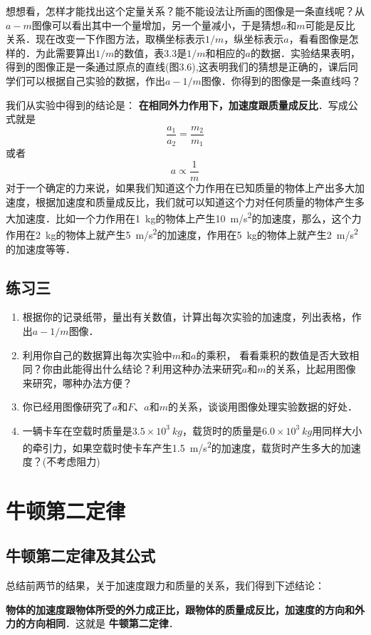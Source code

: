 想想看，怎样才能找出这个定量关系？能不能设法让所画的图像是一条直线呢？从$a-m$图像可以看出其中一个量增加，另一个量减小，于是猜想$a$和$m$可能是反比关系．现在改变一下作图方法，取横坐标表示$1/m$，纵坐标表示$a$，看看图像是怎样的．为此需要算出$1/m$的数值，表3.3是$1/m$和相应的$a$的数据．实验结果表明，得到的图像正是一条通过原点的直线(图3.6),这表明我们的猜想是正确的，课后同学们可以根据自己实验的数据，作出$a-1/m$图像．你得到的图像是一条直线吗？


我们从实验中得到的结论是：\textbf{ 在相同外力作用下，加速度跟质量成反比}．写成公式就是
\[\frac{a_1}{a_2}=\frac{m_2}{m_1} \]
或者
\[a\propto \frac{1}{m} \]
对于一个确定的力来说，如果我们知道这个力作用在已知质量的物体上产出多大加速度，根据加速度和质量成反比，我们就可以知道这个力对任何质量的物体产生多大加速度．比如一个力作用在\SI{1}{kg}的物体上产生\SI{10}{m/s^2}的加速度，那么，这个力作用在\SI{2}{kg}的物体上就产生\SI{5}{m/s^2}的加速度，作用在\SI{5}{kg}的物体上就产生\SI{2}{m/s^2}的加速度等等．

\subsection*{练习三}
\begin{enumerate}
    \item 根据你的记录纸带，量出有关数值，计算出每次实验的加速度，列出表格，作出$a-1/m$图像．
    \item 利用你自己的数据算出每次实验中$m$和$a$的乘积，
          看看乘积的数值是否大致相同？你由此能得出什么结论？利用这种办法来研究$a$和$m$的关系，比起用图像来研究，哪种办法方便？
    \item 你已经用图像研究了$a$和$F$、$a$和$m$的关系，谈谈用图像处理实验数据的好处．
    \item 一辆卡车在空载时质量是$3.5\times 10^3~\si{kg}$，载货时的质量是$6.0\times 10^3~\si{kg}$用同样大小的牵引力，如果空载时使卡车产生\SI{1.5}{m/s^2}的加速度，载货时产生多大的加速度？(不考虑阻力)
\end{enumerate}
\newpage
\section{牛顿第二定律}
\subsection{牛顿第二定律及其公式}

总结前两节的结果，关于加速度跟力和质量的关系，我们得到下述结论：

\textbf{ 物体的加速度跟物体所受的外力成正比，跟物体的质量成反比，加速度的方向和外力的方向相同}．这就是\textbf{ 牛顿第二定律}．


